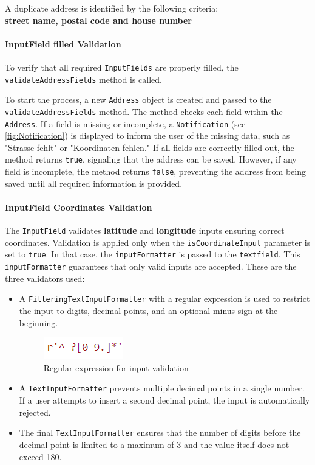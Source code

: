     A duplicate address is identified by the following criteria:\\
    \textbf{street name, postal code and house number}
    


\newpage

\paragraph{InputField filled Validation}
To verify that all required \texttt{InputFields} are properly filled, the \texttt{validateAddressFields} method is called.

To start the process, a new \texttt{Address} object is created and passed to the \texttt{validateAddressFields} method. The method checks each field within the \texttt{Address}. If a field is missing or incomplete, a \texttt{Notification} (see \ref{fig:Notification}) is displayed to inform the user of the missing data, such as "Strasse fehlt" or "Koordinaten fehlen." If all fields are correctly filled out, the method returns \texttt{true}, signaling that the address can be saved. However, if any field is incomplete, the method returns \texttt{false}, preventing the address from being saved until all required information is provided.



\paragraph{InputField Coordinates Validation}
\label{fig:InputField Coordinates Validation}
    The \texttt{InputField} validates \textbf{latitude} and \textbf{longitude} inputs ensuring correct coordinates. Validation is applied only when the \texttt{isCoordinateInput} parameter is set to \texttt{true}. In that case, the \texttt{inputFormatter} is passed to the \texttt{textfield}. This \texttt{inputFormatter} guarantees that only valid inputs are accepted. These are the three validators used:


    \begin{itemize}
        \item A \texttt{FilteringTextInputFormatter} with a regular expression is used to restrict the input to digits, decimal points, and an optional minus sign at the beginning.
        \begin{figure}[H]
            \centering
            \includegraphics[width=0.2\linewidth]{images/AdminPanel/regexInputFormatter.png}
            \caption{Regular expression for input validation}
        \end{figure}
        \item A \texttt{TextInputFormatter} prevents multiple decimal points in a single number. If a user attempts to insert a second decimal point, the input is automatically rejected.
        \item The final \texttt{TextInputFormatter} ensures that the number of digits before the decimal point is limited to a maximum of 3 and the value itself does not exceed 180.
    \end{itemize}
    

